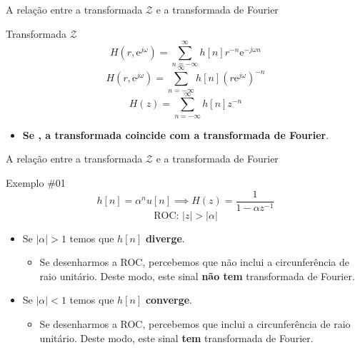 \begin{frame}{A relação entre a transformada $\mathcal{Z}$ e a transformada de Fourier}
\begin{block}{Transformada $\mathcal{Z}$}
$$H(r,\text{e}^{j\omega}) = \sum_{n=-\infty}^{\infty}h[n]r^{-n} \text{e}^{-j\omega n}$$
$$H(r,\text{e}^{j\omega}) = \sum_{n=-\infty}^{\infty}h[n](r\text{e}^{j\omega})^{-n}$$
$$\boxed{H(z) = \sum_{n=-\infty}^{\infty}h[n]z^{-n}}$$
\begin{itemize}
    \item \textbf{Se , a transformada  coincide com a transformada de Fourier}.
\end{itemize}
\end{block}
\end{frame}

\begin{frame}{A relação entre a transformada $\mathcal{Z}$ e a transformada de Fourier}
\begin{block}{Exemplo \#01}
$$h[n] = \alpha^n u[n] \implies H(z) = \dfrac{1}{1 - \alpha z^{-1}}$$
$$\text{ROC: } |z|>|\alpha|$$
\begin{itemize}
    \item Se $|\alpha| > 1$ temos que $h[n]$ \textbf{diverge}.
    \begin{itemize}
        \item Se desenharmos a ROC, percebemos que não inclui a circunferência de raio unitário. Deste modo, este sinal \textbf{não tem} transformada de Fourier.
    \end{itemize}
    \item Se $|\alpha| < 1$ temos que $h[n]$ \textbf{converge}.
    \begin{itemize}
        \item Se desenharmos a ROC, percebemos que inclui a circunferência de raio unitário. Deste modo, este sinal \textbf{tem} transformada de Fourier.
    \end{itemize}
\end{itemize}
\end{block}
\end{frame}

